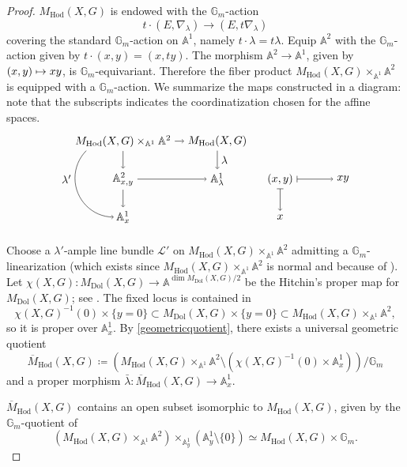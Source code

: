 \documentclass[11pt]{article}
\let\mathcal\mathscr
\newcommand\mto{\mathchoice{\longmapsto}{\mapsto}{\mapsto}{\mapsto}}
\theoremstyle{definition}
\newcommand{\Aff}{\mathbb{A}}
\newcommand{\Gm}{\mathbb{G}_m}
\newcommand{\MDolG}{{M}_{\mathrm{Dol}}(X,G)}
\newcommand{\MHodG}{{M}_{\mathrm{Hod}}(X,G)}
\newcommand{\bMHodG}{\overline{M}_{\mathrm{Hod}}(X,G)}
\begin{document}
\begin{proof}
$\MHodG$ is endowed with the $\Gm$\nobreakdash-action
\[
t \cdot (E, \nabla_{\lambda}) \to (E, t \nabla_{\lambda})
\]
covering the standard $\Gm$\nobreakdash-action on $\Aff^1$, namely $t \cdot \lambda =t\lambda$.
Equip $\Aff^2$ with the $\Gm$\nobreakdash-action given by $t \cdot (x,y)=(x, ty)$. The morphism $\Aff^2 \to \Aff^1$, given by $(x, y) \mto xy$, is $\Gm$\nobreakdash-equivariant. Therefore the fiber product $\MHodG \times_{\Aff^1}\Aff^2$ is equipped with a $\Gm$\nobreakdash-action. We summarize the maps constructed in a diagram: note that the subscripts indicates the coordinatization chosen for the affine spaces.
\[
\begin{tikzpicture}
\node (A) at (0,1.2) {$\MHodG \times_{\Aff^1}\Aff^2$};
\node (B) at (3,1.2) {$\MHodG$};
\node (C) at (0,0) {$\Aff^2_{x,y}$};
\node (D) at (3,0) {$\Aff^1_{\lambda}$};
\node (E) at (0,-1.2) {$\Aff^1_{x}$};
\node (F) at (5,0) {$(x,y)$};
\node (G) at (7,0) {$xy$};
\node (H) at (5,-1.2) {$x$};
\draw%
[->] (A) -- (C);
\draw%
[->] (B) -- (D) node [midway,right] {$\lambda$};
\draw%
[->] (A) -- (B) node [midway,above] {};
\draw%
[->] (C) -- (D) node [midway,above] {};
\draw%
[->] (C) -- (E);
\draw%
[|->] (F) -- (G);
\draw%
[|->] (F) -- (H);
\node at (-1.8,0) {$\lambda'$};
\draw%
[<-] (-0.3,-1.2) arc(270:135:35pt and 35pt);
\end{tikzpicture}
\]

Choose a $\lambda'$-ample line bundle $\mathcal{L}'$ on $\MHodG \times_{\Aff^1}\Aff^2$ admitting a $\Gm$\nobreakdash-lin\-earization (which exists since $\MHodG \times_{\Aff^1}\Aff^2$ is normal and because of \cite[Cor.\,1.6]{MumfordFogartyKirwan1994}).
Let $\chi(X, G)\colon \MDolG \to \Aff^{\dim \MDolG/2}$ be the Hitchin's proper map for $\MDolG$; see \cite[p.\,22]{Simpson1994}. The fixed locus is contained in
\[
\chi(X, G)^{-1}(0) \times \{ y = 0\} \subset \MDolG \times \{ y = 0\} \subset \MHodG \times_{\Aff^1} \Aff^2,
\]
so it is proper over $\Aff^1_x$. By \cref{geometricquotient}, there exists a universal geometric quotient
\[
\bMHodG \coloneqq (\MHodG \times_{\Aff^1}\Aff^2 \setminus (\chi(X, G)^{-1}(0) \times \Aff^1_x))/\Gm
\]
and a proper morphism $\bar{\lambda}\colon \bMHodG \to \Aff^1_x$.

$\bMHodG$ contains an open subset isomorphic to $\MHodG$, given by the $\Gm$\nobreakdash-quotient of
\[
(\MHodG \times_{\Aff^1}\Aff^2)\times_{\Aff^1_y} (\Aff^1_y \setminus \{0\}) \simeq \MHodG \times \Gm.
\]


\end{proof}
\end{document}
